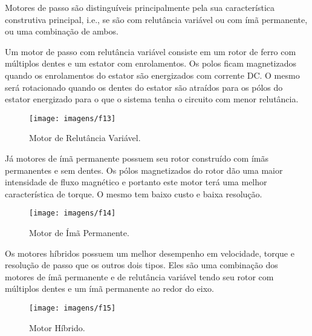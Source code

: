 Motores de passo são distinguíveis principalmente pela sua característica construtiva principal, i.e., se são com relutância variável ou com ímã permanente, ou uma combinação de ambos.

Um motor de passo com relutância variável consiste em um rotor de ferro com múltiplos dentes e um estator com enrolamentos. Os polos ficam magnetizados quando os enrolamentos do estator são energizados com corrente DC. O mesmo será rotacionado quando os dentes do estator são atraídos para os pólos do estator energizado para o que o sistema tenha o circuito com menor relutância. 

\begin{figure}[ht!]
    \center 
    \texttt{[image: imagens/f13]}
    \caption{Motor de Relutância Variável.}
\end{figure}

Já motores de ímã permanente possuem seu rotor construído com ímãs permanentes e sem dentes. Os pólos magnetizados do rotor dão uma maior intensidade de fluxo magnético e portanto este motor terá uma melhor característica de torque. O mesmo tem baixo custo e baixa resolução. 

\begin{figure}[ht!]
    \center 
    \texttt{[image: imagens/f14]}
    \caption{Motor de Ímã Permanente.}
    \end{figure}
\newpage

Os motores híbridos possuem um melhor desempenho em velocidade, torque e resolução de passo que os outros dois tipos. Eles são uma combinação dos motores de ímã permanente e de relutância variável tendo seu rotor com múltiplos dentes e um ímã permanente ao redor do eixo. 


\begin{figure}[ht!]
    \center 
    \texttt{[image: imagens/f15]}
    \caption{Motor Híbrido.}
\end{figure}

